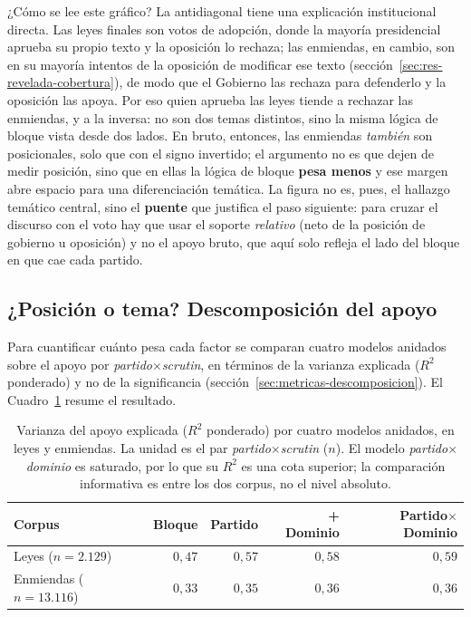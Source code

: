 ¿Cómo se lee este gráfico? La antidiagonal tiene una explicación institucional
directa. Las leyes finales son votos de adopción, donde la mayoría presidencial
aprueba su propio texto y la oposición lo rechaza; las enmiendas, en cambio, son
en su mayoría intentos de la oposición de modificar ese texto
(sección~\ref{sec:res-revelada-cobertura}), de modo que el Gobierno las rechaza
para defenderlo y la oposición las apoya. Por eso quien aprueba las leyes tiende a
rechazar las enmiendas, y a la inversa: no son dos temas distintos, sino la misma
lógica de bloque vista desde dos lados. En bruto, entonces, las enmiendas
\emph{también} son posicionales, solo que con el signo invertido; el argumento no
es que dejen de medir posición, sino que en ellas la lógica de bloque \textbf{pesa
menos} y ese margen abre espacio para una diferenciación temática. La figura no es,
pues, el hallazgo temático central, sino el \textbf{puente} que justifica el paso
siguiente: para cruzar el discurso con el voto hay que usar el soporte
\emph{relativo} (neto de la posición de gobierno u oposición) y no el apoyo bruto,
que aquí solo refleja el lado del bloque en que cae cada partido.

\subsection{¿Posición o tema? Descomposición del apoyo}
\label{sec:res-revelada-descomposicion}

Para cuantificar cuánto pesa cada factor se comparan cuatro modelos anidados
sobre el apoyo por \emph{partido$\times$scrutin}, en términos de la varianza
explicada ($R^2$ ponderado) y no de la significancia
(sección~\ref{sec:metricas-descomposicion}). El Cuadro~\ref{tab:r2-voto} resume
el resultado.

\begin{table}[H]
\centering
\caption{Varianza del apoyo explicada ($R^2$ ponderado) por cuatro modelos
anidados, en leyes y enmiendas. La unidad es el par \emph{partido$\times$scrutin}
($n$). El modelo \emph{partido$\times$dominio} es saturado, por lo que su $R^2$ es
una cota superior; la comparación informativa es entre los dos corpus, no el
nivel absoluto.}
\label{tab:r2-voto}
\begin{tabular}{@{}l r r r r@{}}
\toprule
\textbf{Corpus} & \textbf{Bloque} & \textbf{Partido} & \textbf{+ Dominio} & \textbf{Partido$\times$Dominio} \\
\midrule
Leyes ($n=2.129$) & $0{,}47$ & $0{,}57$ & $0{,}58$ & $0{,}59$ \\
Enmiendas ($n=13.116$) & $0{,}33$ & $0{,}35$ & $0{,}36$ & $0{,}36$ \\
\bottomrule
\end{tabular}
\end{table}

